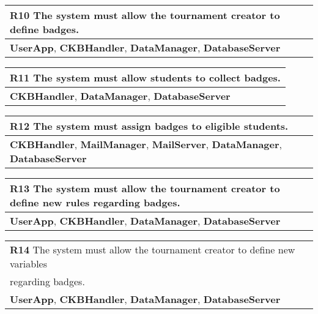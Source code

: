 \begin{table}[H]
    \begin{tabularx}{\textwidth}{X}
        \toprule
        \textbf{R10} The system must allow the tournament creator to define badges. \\ \midrule
        \textbf{UserApp}, \textbf{CKBHandler}, \textbf{DataManager}, \textbf{DatabaseServer}                    \\
    \end{tabularx}
\end{table}

\begin{table}[H]
    \begin{tabularx}{\textwidth}{X}
        \toprule
        \textbf{R11} The system must allow students to collect badges.  \\ \midrule
        \textbf{CKBHandler}, \textbf{DataManager}, \textbf{DatabaseServer}                     \\
    \end{tabularx}
\end{table}

\begin{table}[H]
    \begin{tabularx}{\textwidth}{X}
        \toprule
        \textbf{R12} The system must assign badges to eligible students. \\ \midrule
        \textbf{CKBHandler}, \textbf{MailManager}, \textbf{MailServer}, \textbf{DataManager}, \textbf{DatabaseServer}                     \\
    \end{tabularx}
\end{table}

\begin{table}[H]
    \begin{tabularx}{\textwidth}{X}
        \toprule
        \textbf{R13} The system must allow the tournament creator to define new rules regarding badges. \\ \midrule
        \textbf{UserApp}, \textbf{CKBHandler}, \textbf{DataManager}, \textbf{DatabaseServer}                    \\
    \end{tabularx}
\end{table}

\begin{table}[H]
    \begin{tabularx}{\textwidth}{X}
        \toprule
        \textbf{R14} The system must allow the tournament creator to define new variables \\ regarding badges. \\ \midrule
        \textbf{UserApp}, \textbf{CKBHandler}, \textbf{DataManager}, \textbf{DatabaseServer}                    \\
    \end{tabularx}
\end{table}

